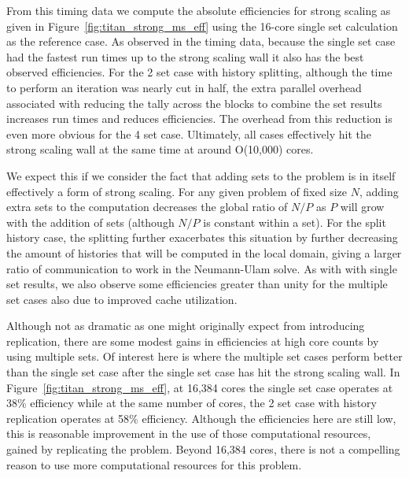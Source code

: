 \documentclass{snamc2013}
\begin{document}
From this timing data we compute the absolute efficiencies for strong
scaling as given in Figure~\ref{fig:titan_strong_ms_eff} using the
16-core single set calculation as the reference case. As observed in
the timing data, because the single set case had the fastest run times
up to the strong scaling wall it also has the best observed
efficiencies. For the 2 set case with history splitting, although the
time to perform an iteration was nearly cut in half, the extra
parallel overhead associated with reducing the tally across the blocks
to combine the set results increases run times and reduces
efficiencies. The overhead from this reduction is even more obvious
for the 4 set case. Ultimately, all cases effectively hit the strong
scaling wall at the same time at around O(10,000) cores.

We expect this if we consider the fact that adding sets to the problem
is in itself effectively a form of strong scaling. For any given
problem of fixed size $N$, adding extra sets to the computation
decreases the global ratio of $N/P$ as $P$ will grow with the addition
of sets (although $N/P$ is constant within a set). For the split
history case, the splitting further exacerbates this situation by
further decreasing the amount of histories that will be computed in
the local domain, giving a larger ratio of communication to work in
the Neumann-Ulam solve. As with with single set results, we also
observe some efficiencies greater than unity for the multiple set
cases also due to improved cache utilization.

Although not as dramatic as one might originally expect from
introducing replication, there are some modest gains in efficiencies
at high core counts by using multiple sets. Of interest here is where
the multiple set cases perform better than the single set case after
the single set case has hit the strong scaling wall. In
Figure~\ref{fig:titan_strong_ms_eff}, at 16,384 cores the single set
case operates at 38\% efficiency while at the same number of cores,
the 2 set case with history replication operates at 58\%
efficiency. Although the efficiencies here are still low, this is
reasonable improvement in the use of those computational resources,
gained by replicating the problem. Beyond 16,384 cores, there is not a
compelling reason to use more computational resources for this
problem.
\end{document}
